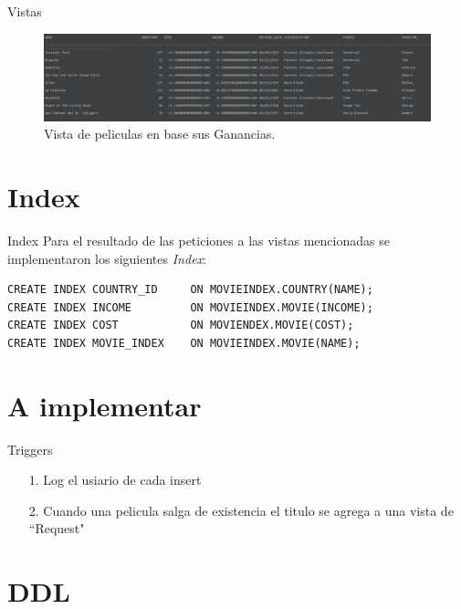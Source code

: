 \documentclass{beamer}%
\begin{document}
\begin{frame}{Vistas}
\begin{figure}
    \centering
  	\includegraphics[scale=0.15]{figures/screenshot_vista3.png}
  	  	\caption{Vista de peliculas en base sus Ganancias.} \label{vista3}
\end{figure}
\end{frame}

\section{Index}

\begin{frame}[fragile]{Index}
Para el resultado de las peticiones a las vistas mencionadas se implementaron los siguientes \textit{Index}:

\begin{verbatim}
CREATE INDEX COUNTRY_ID 	ON MOVIEINDEX.COUNTRY(NAME);
CREATE INDEX INCOME 		ON MOVIEINDEX.MOVIE(INCOME);
CREATE INDEX COST			ON MOVIENDEX.MOVIE(COST);
CREATE INDEX MOVIE_INDEX	ON MOVIEINDEX.MOVIE(NAME);
\end{verbatim}

\end{frame}

\section{A implementar}


\begin{frame}{Triggers}
\begin{itemize}
\item[1.]Log el usiario de cada insert
\item[2.]Cuando una pelicula salga de existencia el titulo se agrega a una vista de ``Request"

\end{itemize}

\end{frame}

\section{DDL}
\begin{frame}

\end{frame}
\end{document}
